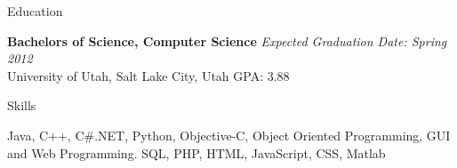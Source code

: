\documentclass{resume}
\begin{document}
\begin{rSection}{Education}

{\bf Bachelors of Science, Computer Science} \hfill {\em Expected Graduation Date: Spring 2012} \\ 
University of Utah, Salt Lake City, Utah \hfill  GPA: 3.88

\end{rSection}


\begin{rSection}{Skills}

Java, C++, C\#.NET, Python, Objective-C, Object Oriented Programming, GUI and Web Programming. SQL, PHP, HTML, JavaScript, CSS, Matlab

\end{rSection}

\end{document}
